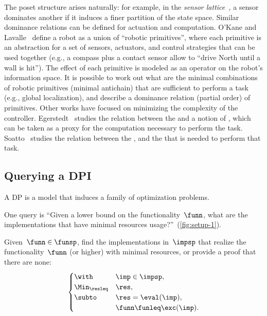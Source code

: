 The poset structure arises naturally: for example, in the \emph{sensor
lattice}~\cite{lavalle12sensing}\emph{,} a sensor dominates another
if it induces a finer partition of the state space. Similar dominance
relations can be defined for actuation and computation. O'Kane and
Lavalle~\cite{okane08comparing} define a robot as a union of ``robotic
primitives'', where each primitive is an abstraction for a set of
sensors, actuators, and control strategies that can be used together
(e.g., a compass plus a contact sensor allow to ``drive North until
a wall is hit''). The effect of each primitive is modeled as an operator
on the robot's information space. It is possible to work out what
are the minimal combinations of robotic primitives (minimal antichain)
that are sufficient to perform a task (e.g., global localization),
and describe a dominance relation (partial order) of primitives. Other
works have focused on minimizing the complexity of the controller.
Egerstedt~\cite{egerstedt03motion} studies the relation between
the  and a notion of , which can be taken as
a proxy for the computation necessary to perform the task. Soatto~\cite{soatto11steps}
studies the relation between the ,
and the  that is needed to perform that
task. 



\begin{example}
\end{example}



\subsection{Querying a DPI}

A DP is a model that induces a family of optimization problems.


One query is
``Given a lower bound on the functionality~$\funn$, what
are the implementations that have minimal resources usage?''~(\cref{fig:setup-1}).

\begin{problem}[FixFunMinReq]
\label{prob:problem1}Given~$\funn\in\funsp$, find the implementations
in~$\impsp$ that realize the functionality~$\funn$ (or higher)
with minimal resources, or provide a proof that there are none:
\begin{equation}
\begin{cases}
\with & \imp\in\impsp,\\
\Min_{\resleq} & \res,\\
\subto & \res=\eval(\imp),\\
 & \funn\funleq\exc(\imp).
\end{cases}\label{eq:objective}
\end{equation}
\end{problem}


